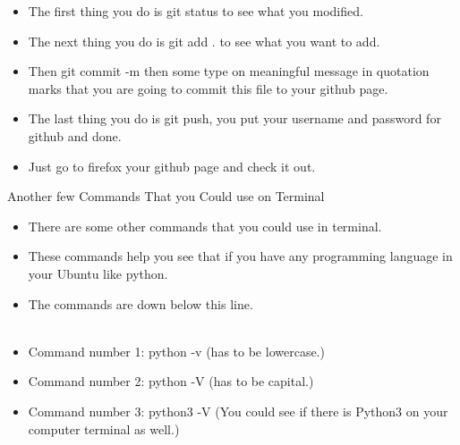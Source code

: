 \documentclass[aspectratio=43]{beamer}
\begin{document}
\begin{frame}
\begin{itemize}

\item The first thing you do is git status to see what you modified.
\item The next thing you do is git add . to see what you want to add.
\item Then git commit -m then some type on meaningful message in quotation marks that you are going to commit this file to your github page.
\item The last thing you do is git push, you put your username and password for github and done.
\item Just go to firefox your github page and check it out.
\end{itemize}
\end{frame}


\begin{frame}{Another few Commands That you Could use on Terminal}
\begin{itemize}

\item There are some other commands that you could use in terminal.
\item These commands help you see that if you have any programming language in your Ubuntu like python.
\item The commands are down below this line.
\\
~\\ 
\item Command number 1: python -v (has to be lowercase.)
\item Command number 2: python -V (has to be capital.)
\item Command number 3: python3 -V (You could see if there is Python3 on your computer terminal as well.)
\end{itemize}
\end{frame}
\end{document}
